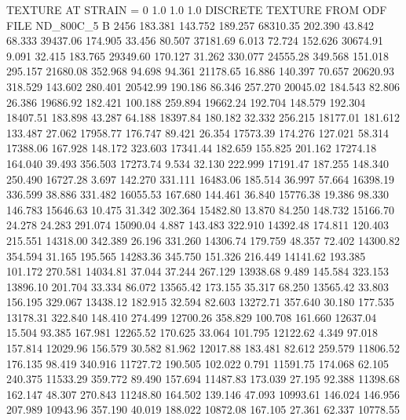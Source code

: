 TEXTURE AT STRAIN = 0
1.0   1.0   1.0
DISCRETE TEXTURE FROM ODF FILE ND_800C_5
B 2456
 183.381  143.752  189.257     68310.35
 202.390   43.842   68.333     39437.06
 174.905   33.456   80.507     37181.69
   6.013   72.724  152.626     30674.91
   9.091   32.415  183.765     29349.60
 170.127   31.262  330.077     24555.28
 349.568  151.018  295.157     21680.08
 352.968   94.698   94.361     21178.65
  16.886  140.397   70.657     20620.93
 318.529  143.602  280.401     20542.99
 190.186   86.346  257.270     20045.02
 184.543   82.806   26.386     19686.92
 182.421  100.188  259.894     19662.24
 192.704  148.579  192.304     18407.51
 183.898   43.287   64.188     18397.84
 180.182   32.332  256.215     18177.01
 181.612  133.487   27.062     17958.77
 176.747   89.421   26.354     17573.39
 174.276  127.021   58.314     17388.06
 167.928  148.172  323.603     17341.44
 182.659  155.825  201.162     17274.18
 164.040   39.493  356.503     17273.74
   9.534   32.130  222.999     17191.47
 187.255  148.340  250.490     16727.28
   3.697  142.270  331.111     16483.06
 185.514   36.997   57.664     16398.19
 336.599   38.886  331.482     16055.53
 167.680  144.461   36.840     15776.38
  19.386   98.330  146.783     15646.63
  10.475   31.342  302.364     15482.80
  13.870   84.250  148.732     15166.70
  24.278   24.283  291.074     15090.04
   4.887  143.483  322.910     14392.48
 174.811  120.403  215.551     14318.00
 342.389   26.196  331.260     14306.74
 179.759   48.357   72.402     14300.82
 354.594   31.165  195.565     14283.36
 345.750  151.326  216.449     14141.62
 193.385  101.172  270.581     14034.81
  37.044   37.244  267.129     13938.68
   9.489  145.584  323.153     13896.10
 201.704   33.334   86.072     13565.42
 173.155   35.317   68.250     13565.42
  33.803  156.195  329.067     13438.12
 182.915   32.594   82.603     13272.71
 357.640   30.180  177.535     13178.31
 322.840  148.410  274.499     12700.26
 358.829  100.708  161.660     12637.04
  15.504   93.385  167.981     12265.52
 170.625   33.064  101.795     12122.62
   4.349   97.018  157.814     12029.96
 156.579   30.582   81.962     12017.88
 183.481   82.612  259.579     11806.52
 176.135   98.419  340.916     11727.72
 190.505  102.022    0.791     11591.75
 174.068   62.105  240.375     11533.29
 359.772   89.490  157.694     11487.83
 173.039   27.195   92.388     11398.68
 162.147   48.307  270.843     11248.80
 164.502  139.146   47.093     10993.61
 146.024  146.956  207.989     10943.96
 357.190   40.019  188.022     10872.08
 167.105   27.361   62.337     10778.55
